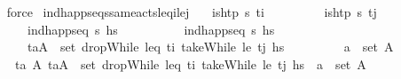\begin{isabellebody}
\ \ \ \ \isamarkupfalse%
\ force\isanewline
{}\isamarkupfalse%
%
\endisatagproof
{\isafoldproof}%
%
\isadelimproof
\isanewline
%
\endisadelimproof
\isanewline
{}\isamarkupfalse%
\ ind{\isacharunderscore}{\kern0pt}happ{\isacharunderscore}{\kern0pt}seqs{\isacharunderscore}{\kern0pt}same{\isacharunderscore}{\kern0pt}acts{\isacharunderscore}{\kern0pt}leq\isactrlsub i{\isacharunderscore}{\kern0pt}le\isactrlsub j{\isacharprime}{\kern0pt}{\isacharcolon}{\kern0pt}\isanewline
\ \ \ {\isachardoublequoteopen}is{\isacharunderscore}{\kern0pt}htp\ {\isasympi}s\ t\isactrlsub i{\isachardoublequoteclose}\isanewline
\ \ \ \ \ \ \ \ \ {\isachardoublequoteopen}is{\isacharunderscore}{\kern0pt}htp\ {\isasympi}s\ t\isactrlsub j{\isachardoublequoteclose}\isanewline
\ \ \ \ \ \ \ \ \ {\isachardoublequoteopen}ind{\isacharunderscore}{\kern0pt}happ{\isacharunderscore}{\kern0pt}seq\ {\isasympi}s\ hs\ \isanewline
\ \ \ \ \ \ \ \ \ {\isachardoublequoteopen}ind{\isacharunderscore}{\kern0pt}happ{\isacharunderscore}{\kern0pt}seq\ {\isasympi}s\ hs\isanewline
\ \ \ \ \ \ \ \ \ {\isachardoublequoteopen}{\isacharparenleft}{\kern0pt}t\isactrlsub a{\isacharcomma}{\kern0pt}A{\isacharparenright}{\kern0pt}\ {\isasymin}\ set\ {\isacharparenleft}{\kern0pt}dropWhile\ {\isacharparenleft}{\kern0pt}leq\ t\isactrlsub i{\isacharparenright}{\kern0pt}\ {\isacharparenleft}{\kern0pt}takeWhile\ {\isacharparenleft}{\kern0pt}le\ t\isactrlsub j{\isacharparenright}{\kern0pt}\ hs\isanewline
\ \ \ \ \ \ \ \ \ {\isachardoublequoteopen}a\ {\isasymin}\ set\ A{\isachardoublequoteclose}\isanewline
\ \ \ \ \ \ \ {\isachardoublequoteopen}{\isasymexists}t\isactrlsub a{\isacharprime}{\kern0pt}\ A{\isacharprime}{\kern0pt}{\isachardot}{\kern0pt}\ {\isacharparenleft}{\kern0pt}t\isactrlsub a{\isacharprime}{\kern0pt}{\isacharcomma}{\kern0pt}A{\isacharprime}{\kern0pt}{\isacharparenright}{\kern0pt}\ {\isasymin}\ set\ {\isacharparenleft}{\kern0pt}dropWhile\ {\isacharparenleft}{\kern0pt}leq\ t\isactrlsub i{\isacharparenright}{\kern0pt}\ {\isacharparenleft}{\kern0pt}takeWhile\ {\isacharparenleft}{\kern0pt}le\ t\isactrlsub j{\isacharparenright}{\kern0pt}\ hs\ {\isasymand}\ a\ {\isasymin}\ set\ A{\isacharprime}{\kern0pt}{\isachardoublequoteclose}\isanewline

\end{isabellebody}
